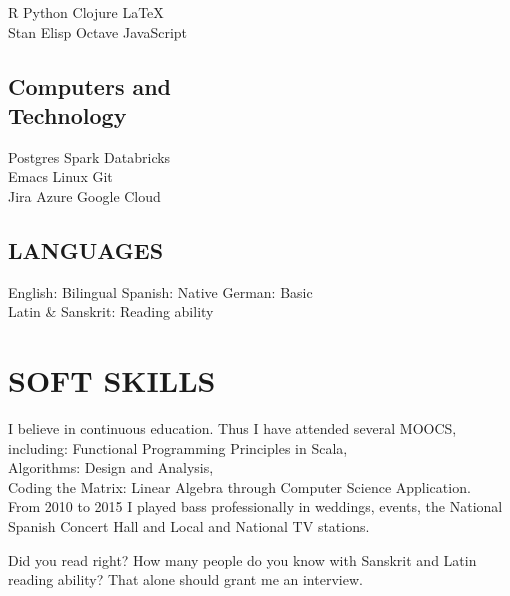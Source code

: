 \documentclass[]{deedy-resume-openfont}
\begin{document}
\begin{minipage}[t]{0.33\textwidth}
R \textbullet{} Python \textbullet{} Clojure \textbullet{} \LaTeX\ \\ 
Stan \textbullet{} Elisp \textbullet{} Octave \textbullet{} JavaScript \\

\sectionsep

\subsection{Computers and \\  Technology}

Postgres \textbullet{} Spark \textbullet{} Databricks \\
Emacs \textbullet{} Linux \textbullet{} Git \\
Jira \textbullet{} Azure  \textbullet{} Google Cloud  \\

\sectionsep

\subsection{LANGUAGES}

English: Bilingual \textbullet{} Spanish: Native \textbullet{} German: Basic \\
Latin & Sanskrit: Reading ability \\

\sectionsep

\section{SOFT SKILLS} 
I believe in continuous education. Thus I have attended several MOOCS, including:
Functional Programming Principles in Scala,\\
Algorithms: Design and Analysis,\\
Coding the Matrix: Linear Algebra through Computer Science Application. \\

\sectionsep
From 2010 to 2015 I played bass professionally in weddings, events, the National Spanish Concert Hall and Local and National TV stations.
\sectionsep

\sectionsep
Did you read right? How many people do you know with Sanskrit and Latin reading ability?
That alone should grant me an interview.
\sectionsep


%
%

\end{minipage} 
\end{document}
